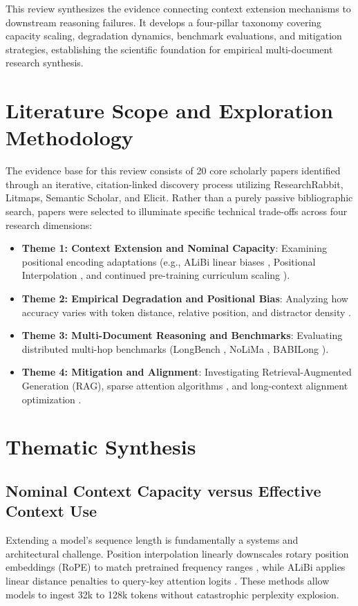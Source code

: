 \documentclass[manuscript,screen,oneside]{acmart}
\begin{document}
This review synthesizes the evidence connecting context extension mechanisms to downstream reasoning failures. It develops a four-pillar taxonomy covering capacity scaling, degradation dynamics, benchmark evaluations, and mitigation strategies, establishing the scientific foundation for empirical multi-document research synthesis.

\section{Literature Scope and Exploration Methodology}\label{sec:scope}
The evidence base for this review consists of 20 core scholarly papers identified through an iterative, citation-linked discovery process utilizing ResearchRabbit, Litmaps, Semantic Scholar, and Elicit. Rather than a purely passive bibliographic search, papers were selected to illuminate specific technical trade-offs across four research dimensions:
\begin{itemize}
    \item \textbf{Theme 1: Context Extension and Nominal Capacity}: Examining positional encoding adaptations (e.g., ALiBi linear biases \cite{press2022train}, Positional Interpolation \cite{chen2023extending}, and continued pre-training curriculum scaling \cite{stallone2024granite}).
    \item \textbf{Theme 2: Empirical Degradation and Positional Bias}: Analyzing how accuracy varies with token distance, relative position, and distractor density \cite{liu2024lost,du2025contextlength,veseli2025positional}.
    \item \textbf{Theme 3: Multi-Document Reasoning and Benchmarks}: Evaluating distributed multi-hop benchmarks (LongBench \cite{bai2024longbench}, NoLiMa \cite{modarressi2025nolima}, BABILong \cite{kuratov2024babilong}).
    \item \textbf{Theme 4: Mitigation and Alignment}: Investigating Retrieval-Augmented Generation (RAG), sparse attention algorithms \cite{yan2025adamas}, and long-context alignment optimization \cite{tang2025logo,tian2025untie}.
\end{itemize}

\section{Thematic Synthesis}\label{sec:synthesis}

\subsection{Nominal Context Capacity versus Effective Context Use}
Extending a model's sequence length is fundamentally a systems and architectural challenge. Position interpolation linearly downscales rotary position embeddings (RoPE) to match pretrained frequency ranges \cite{chen2023extending}, while ALiBi applies linear distance penalties to query-key attention logits \cite{press2022train}. These methods allow models to ingest 32k to 128k tokens without catastrophic perplexity explosion.
\end{document}
